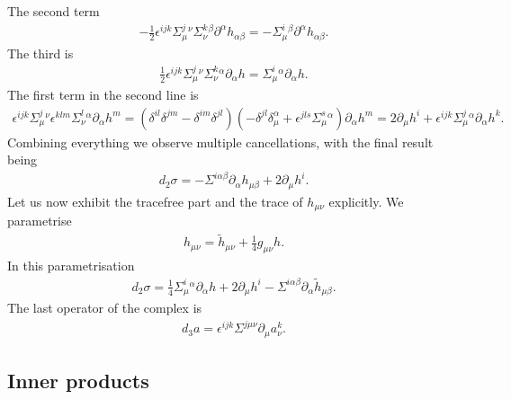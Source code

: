 \documentclass[10pt]{report}
\theoremstyle{definition}
\begin{document}
The second term
\begin{align}
- \frac{1}{2} \epsilon^{ijk}\Sigma^j_\mu{}^\nu  \Sigma^k_\nu{}^\beta \partial^\alpha h_{\alpha\beta} =- \Sigma^i_\mu{}^\beta  \partial^\alpha h_{\alpha\beta} .
\end{align}
The third is
\begin{align}
\frac{1}{2} \epsilon^{ijk}\Sigma^j_\mu{}^\nu \Sigma^k_\nu{}^\alpha \partial_\alpha h =  \Sigma^i_\mu{}^\alpha  \partial_\alpha h.
\end{align}
The first term in the second line is
\begin{align}\nonumber
\epsilon^{ijk}\Sigma^j_\mu{}^\nu \epsilon^{klm} \Sigma^l_\nu{}^\alpha \partial_\alpha h^m = ( \delta^{il}\delta^{jm} - \delta^{im}\delta^{jl}) ( - \delta^{jl} \delta_\mu^\alpha + \epsilon^{jls}\Sigma^s_\mu{}^\alpha) \partial_\alpha h^m = 2 \partial_\mu h^i + \epsilon^{ijk} \Sigma^j_\mu{}^\alpha \partial_\alpha h^k.
\end{align}
Combining everything we observe multiple cancellations, with the final result being
\begin{align}\label{d2-explicitly}
d_2 \sigma = -  \Sigma^{i\alpha\beta} \partial_\alpha h_{\mu\beta} +2 \partial_\mu h^i.
\end{align}
Let us now exhibit the tracefree part and the trace of $h_{\mu\nu}$ explicitly. We parametrise
\begin{align}\label{h-tilde}
h_{\mu\nu} = \tilde{h}_{\mu\nu} + \frac{1}{4} g_{\mu\nu} h.
\end{align}
In this parametrisation 
\begin{align}
d_2 \sigma = \frac{1}{4} \Sigma^i_\mu{}^\alpha \partial_\alpha h +2 \partial_\mu h^i -  \Sigma^{i\alpha\beta} \partial_\alpha \tilde{h}_{\mu\beta} .
\end{align}
The last operator of the complex is
\begin{align}
d_3 a = \epsilon^{ijk} \Sigma^{j\mu\nu} \partial_\mu a_\nu^k.
\end{align}

\subsection{Inner products}
\end{document}
